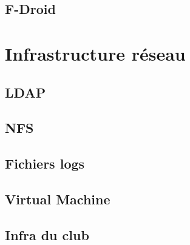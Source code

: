 \documentclass[a4paper]{report}
\begin{document}
  \section{F-Droid}
    
    
\chapter{Infrastructure réseau}
  \section{LDAP}
    
  \section{NFS}
    
  \section{Fichiers logs}
    
  \section{Virtual Machine}
    
  \section{Infra du club}
    
\end{document}
